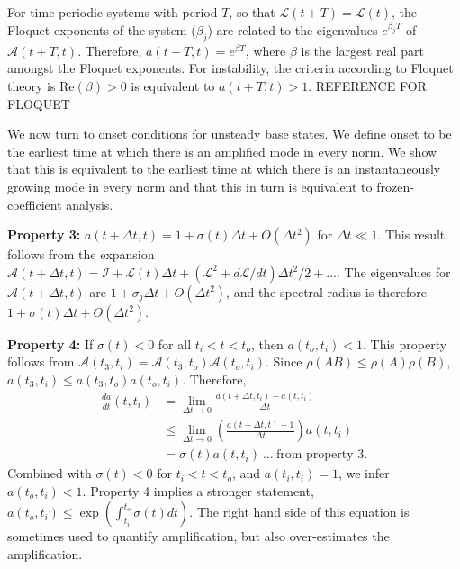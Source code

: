 \documentclass[letterpaper,prl,aps,twocolumn,reprint,superscriptaddress]{revtex4-1}
\newcommand{\cL}{\boldsymbol{\mathcal{L}}}
\newcommand{\cA}{\boldsymbol{\mathcal{A}}}
\newcommand{\cI}{\boldsymbol{\mathcal{I}}}
\newcommand{\obs}{o}
\newcommand{\inc}{i}
\begin{document}
For time periodic systems with period $T$, so that $\cL(t+T) = \cL(t)$, the Floquet exponents of the system ($\beta_j$) are related to the eigenvalues $e^{\beta_j T}$ of $\cA(t+T, t)$. 
Therefore, $a(t+T, t) = e^{\beta T}$, where $\beta$ is the largest real part amongst the Floquet exponents. 
For instability, the criteria according to Floquet theory is $\text{Re}(\beta) > 0$ is equivalent to $a(t+T, t) > 1$.  REFERENCE FOR FLOQUET

We now turn to onset conditions for unsteady base states.  We define onset to be the earliest time at which there is an amplified mode in every norm.  We show that this is equivalent to the earliest time at which there is an instantaneously growing mode in every norm and that this in turn is equivalent to frozen-coefficient analysis.


{\bf Property 3:}
$a(t+\Delta t, t) = 1 + \sigma(t) \Delta t + O(\Delta t^2)$ for $\Delta t \ll 1$. 
This result follows from the expansion $\cA(t+\Delta t, t) = \cI + \cL(t) \Delta t + (\cL^2 + d\cL/dt)\Delta t^2/2 + \dots$.
The eigenvalues for $\cA(t+\Delta t, t)$ are $1 + \sigma_j \Delta t + O(\Delta t^2)$, and the spectral radius is therefore $1 + \sigma(t) \Delta t + O(\Delta t^2).$

{\bf Property 4:}
If $\sigma(t)<0$ for all $t_\inc<t<t_\obs$, then $a(t_\obs, t_\inc) < 1$.
This property follows from $\cA(t_3, t_\inc) = \cA(t_3, t_\obs) \cA(t_\obs, t_\inc)$. 
Since $\rho(AB) \le \rho(A) \rho(B)$, $a(t_3, t_\inc) \le a(t_3, t_\obs) a(t_\obs, t_\inc)$.
Therefore,
\begin{align}
 \frac{da}{dt}(t, t_\inc) &=    \lim_{\Delta t \to 0} \frac{a(t+\Delta t, t_\inc) - a(t, t_\inc)}{\Delta t} \nonumber \\
                       &\le \lim_{\Delta t \to 0} \left(\frac{a(t+\Delta t, t) - 1}{\Delta t}\right) a(t, t_\inc) \nonumber \\
                       &=   \sigma(t) a(t, t_\inc) ~ \dots ~ \text{from property 3.} \label{eqn:prop4}
\end{align}
Combined with $\sigma(t)<0$ for $t_\inc<t<t_\obs$, and $a(t_\inc, t_\inc) = 1$, we infer $a(t_\obs, t_\inc)<1$. Property 4 implies a stronger statement, $ a(t_\obs, t_\inc) \le \exp(\int_{t_\inc}^{t_\obs} \sigma(t) dt).$ The right hand side of this equation is sometimes used to quantify amplification\cite{fullana1999stability,zhang2010wavelength}, but also over-estimates the amplification. 
\end{document}
